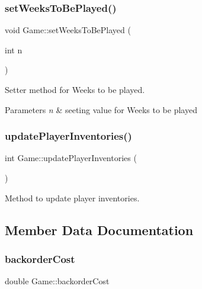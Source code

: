 \subsubsection{\texorpdfstring{set\+Weeks\+To\+Be\+Played()}{setWeeksToBePlayed()}}
{\footnotesize\ttfamily void Game\+::set\+Weeks\+To\+Be\+Played (\begin{DoxyParamCaption}\item[{int}]{n }\end{DoxyParamCaption})}



Setter method for Weeks to be played. 


\begin{DoxyParams}{Parameters}
{\em n} & seeting value for Weeks to be played \\
\hline
\end{DoxyParams}
\mbox{\label{class_game_a87b96a8975a2db552b1f556f488211c3}} 
\subsubsection{\texorpdfstring{update\+Player\+Inventories()}{updatePlayerInventories()}}
{\footnotesize\ttfamily int Game\+::update\+Player\+Inventories (\begin{DoxyParamCaption}{ }\end{DoxyParamCaption})}



Method to update player inventories. 



\subsection{Member Data Documentation}
\mbox{\label{class_game_a413dfabbdffaf493bca059932fe09701}} 
\subsubsection{\texorpdfstring{backorder\+Cost}{backorderCost}}
{\footnotesize\ttfamily double Game\+::backorder\+Cost\hspace{0.3cm}{\ttfamily [private]}}



